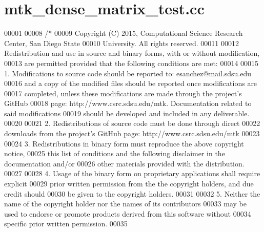 \hypertarget{mtk__dense__matrix__test_8cc_source}{\section{mtk\+\_\+dense\+\_\+matrix\+\_\+test.\+cc}
\label{mtk__dense__matrix__test_8cc_source}
}

\begin{DoxyCode}
00001 
00008 \textcolor{comment}{/*}
00009 \textcolor{comment}{Copyright (C) 2015, Computational Science Research Center, San Diego State}
00010 \textcolor{comment}{University. All rights reserved.}
00011 \textcolor{comment}{}
00012 \textcolor{comment}{Redistribution and use in source and binary forms, with or without modification,}
00013 \textcolor{comment}{are permitted provided that the following conditions are met:}
00014 \textcolor{comment}{}
00015 \textcolor{comment}{1. Modifications to source code should be reported to: esanchez@mail.sdsu.edu}
00016 \textcolor{comment}{and a copy of the modified files should be reported once modifications are}
00017 \textcolor{comment}{completed, unless these modifications are made through the project's GitHub}
00018 \textcolor{comment}{page: http://www.csrc.sdsu.edu/mtk. Documentation related to said modifications}
00019 \textcolor{comment}{should be developed and included in any deliverable.}
00020 \textcolor{comment}{}
00021 \textcolor{comment}{2. Redistributions of source code must be done through direct}
00022 \textcolor{comment}{downloads from the project's GitHub page: http://www.csrc.sdsu.edu/mtk}
00023 \textcolor{comment}{}
00024 \textcolor{comment}{3. Redistributions in binary form must reproduce the above copyright notice,}
00025 \textcolor{comment}{this list of conditions and the following disclaimer in the documentation and/or}
00026 \textcolor{comment}{other materials provided with the distribution.}
00027 \textcolor{comment}{}
00028 \textcolor{comment}{4. Usage of the binary form on proprietary applications shall require explicit}
00029 \textcolor{comment}{prior written permission from the the copyright holders, and due credit should}
00030 \textcolor{comment}{be given to the copyright holders.}
00031 \textcolor{comment}{}
00032 \textcolor{comment}{5. Neither the name of the copyright holder nor the names of its contributors}
00033 \textcolor{comment}{may be used to endorse or promote products derived from this software without}
00034 \textcolor{comment}{specific prior written permission.}
00035 \textcolor{comment}{}

\end{DoxyCode}
